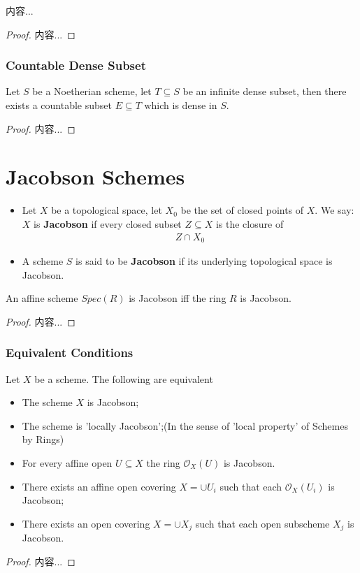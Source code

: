 \documentclass[Total.tex]{subfiles}
\begin{document}
				\begin{lemma}
					内容...
				\end{lemma}
				\begin{proof}
					内容...
				\end{proof}
				\subsubsection{Countable Dense Subset}
				\begin{lemma}
					Let $S$ be a Noetherian scheme, let $T\subseteq S$ be an infinite dense subset, then there exists a countable subset $E\subseteq T$ which is dense in $S$.
				\end{lemma}
				\begin{proof}
					内容...
				\end{proof}
		\section{Jacobson Schemes}
			\begin{Def}
				\begin{itemize}
					\item 	Let $X$ be a topological space, let $X_0$ be the set of closed points of $X$. We say: $X$ is \textbf{Jacobson} if every closed subset $Z\subseteq X$ is the closure of 
					\begin{gather*}
						Z\cap X_0
					\end{gather*}
					\item 	A scheme $S$ is said to be \textbf{Jacobson} if its underlying topological space is Jacobson.
				\end{itemize}
			\end{Def}
			\begin{lemma}
				An affine scheme $Spec(R)$ is Jacobson iff the ring $R$ is Jacobson.
			\end{lemma}
			\begin{proof}
				内容...
			\end{proof}
			\subsubsection{Equivalent Conditions}
			\begin{lemma}
				Let $X$ be a scheme. The following are equivalent
				\begin{itemize}
					\item The scheme $X$ is Jacobson;
					\item The scheme is 'locally Jacobson';(In the sense of 'local property' of Schemes by Rings)
					\item For every affine open $U\subseteq X$ the ring $\mathcal{O}_X(U)$ is Jacobson.
					\item There exists an affine open covering $X=\cup U_i$ such that each $\mathcal{O}_X(U_i)$ is Jacobson;
					\item There exists an open covering $X=\cup X_j$ such that each open subscheme $X_j$ is Jacobson.
				\end{itemize}
			\end{lemma}
			\begin{proof}
				内容...
			\end{proof}
\end{document}
